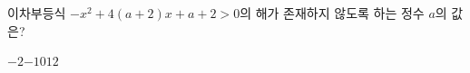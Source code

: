 \hspace*{2mm}\begin{minipage}[t]{\dimexpr\linewidth-2mm\relax}\vspace{0pt}
이차부등식 $-x^2+4(a+2)x+a+2>0$의 해가 존재하지 않도록 하는 정수 $a$의 값은?
\begin{choices32}{$-2$}{$-1$}{$0$}{$1$}{$2$}\end{choices32}\end{minipage}
